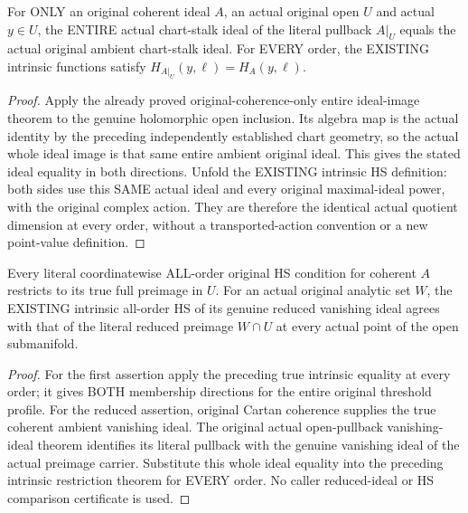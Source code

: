 \begin{theorem}
\label{hir:actual-open-intrinsic-whole-ideal-hs-restriction}
\leanok
For ONLY an original coherent ideal $A$, an actual original open $U$ and
actual $y\in U$, the ENTIRE actual chart-stalk ideal of the literal pullback
$A|_U$ equals the actual original ambient chart-stalk ideal. For EVERY
order, the EXISTING intrinsic functions satisfy
$H_{A|_U}(y,\ell)=H_A(y,\ell)$.
\end{theorem}
\begin{proof}
Apply the already proved original-coherence-only entire ideal-image theorem
to the genuine holomorphic open inclusion. Its algebra map is the actual
identity by the preceding independently established chart geometry, so the
actual whole ideal image is that same entire ambient original ideal. This
gives the stated ideal equality in both directions. Unfold the EXISTING
intrinsic HS definition: both sides use this SAME actual ideal and every
original maximal-ideal power, with the original complex action. They are
therefore the identical actual quotient dimension at every order, without
a transported-action convention or a new point-value definition.
\end{proof}

\begin{theorem}
\label{hir:actual-open-whole-hs-condition-and-reduced-carrier-restriction}
\leanok
Every literal coordinatewise ALL-order original HS condition for coherent
$A$ restricts to its true full preimage in $U$. For an actual original
analytic set $W$, the EXISTING intrinsic all-order HS of its genuine reduced
vanishing ideal agrees with that of the literal reduced preimage $W\cap U$
at every actual point of the open submanifold.
\end{theorem}
\begin{proof}
For the first assertion apply the preceding true intrinsic equality at
every order; it gives BOTH membership directions for the entire original
threshold profile. For the reduced assertion, original Cartan coherence
supplies the true coherent ambient vanishing ideal. The original actual
open-pullback vanishing-ideal theorem identifies its literal pullback with
the genuine vanishing ideal of the actual preimage carrier. Substitute this
whole ideal equality into the preceding intrinsic restriction theorem for
EVERY order. No caller reduced-ideal or HS comparison certificate is used.
\end{proof}
